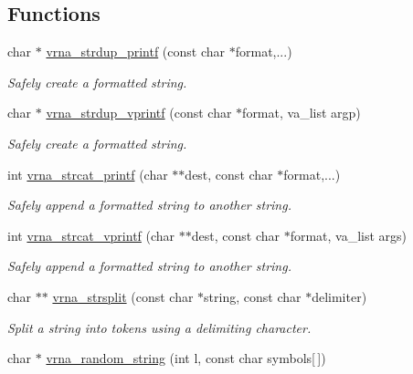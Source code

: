 \subsection*{Functions}
\begin{DoxyCompactItemize}
\item 
char $\ast$ \mbox{\hyperlink{group__string__utils_ga33cc0190a326ec368277caa777b8bf18}{vrna\+\_\+strdup\+\_\+printf}} (const char $\ast$format,...)
\begin{DoxyCompactList}\small\item\em Safely create a formatted string. \end{DoxyCompactList}\item 
char $\ast$ \mbox{\hyperlink{group__string__utils_ga459fdee190ed81bb7773cbaf671748a9}{vrna\+\_\+strdup\+\_\+vprintf}} (const char $\ast$format, va\+\_\+list argp)
\begin{DoxyCompactList}\small\item\em Safely create a formatted string. \end{DoxyCompactList}\item 
int \mbox{\hyperlink{group__string__utils_gac0771ec71316023067f2aae61a5aa0fb}{vrna\+\_\+strcat\+\_\+printf}} (char $\ast$$\ast$dest, const char $\ast$format,...)
\begin{DoxyCompactList}\small\item\em Safely append a formatted string to another string. \end{DoxyCompactList}\item 
int \mbox{\hyperlink{group__string__utils_ga122df216996ba62fd5056b7743e3131a}{vrna\+\_\+strcat\+\_\+vprintf}} (char $\ast$$\ast$dest, const char $\ast$format, va\+\_\+list args)
\begin{DoxyCompactList}\small\item\em Safely append a formatted string to another string. \end{DoxyCompactList}\item 
char $\ast$$\ast$ \mbox{\hyperlink{group__string__utils_gac632775617f4b2df096bfe8efb53d07f}{vrna\+\_\+strsplit}} (const char $\ast$string, const char $\ast$delimiter)
\begin{DoxyCompactList}\small\item\em Split a string into tokens using a delimiting character. \end{DoxyCompactList}\item 
char $\ast$ \mbox{\hyperlink{group__string__utils_ga4eeb3750dcf860b9f3158249f95dbd7f}{vrna\+\_\+random\+\_\+string}} (int l, const char symbols\mbox{[}$\,$\mbox{]})
$$
\end{DoxyCompactItemize}
